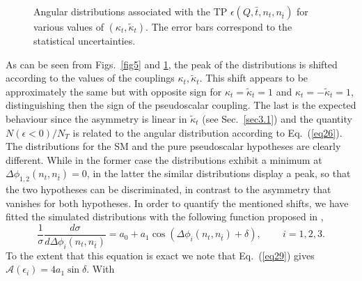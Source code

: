 \documentclass[aps,preprint,tightenlines,floatfix,superscriptaddress,nofootinbib,showpacs]{revtex4-1}
\def\beq{\begin{equation}}
\def\eeq{\end{equation}}
\def\tbar{\bar{t}}
\def\kp{\kappa_t}
\def\kpt{\tilde{\kappa}_t}
\def\TPb{\epsilon(Q,\tbar,n_t,n_{\tbar})}
\begin{document}
\begin{center}
\begin{figure}[H]
\hspace*{-0.006\textwidth}
\caption{Angular distributions associated with the TP $\TPb$ for
  various values of $(\kp,\kpt)$. The error bars correspond to the
  statistical uncertainties.}
\label{fig6}
\end{figure}
\end{center}
\par As can be seen from Figs.~\ref{fig5} and \ref{fig6}, the peak of
the distributions is shifted according to the values of the couplings
$\kp, \kpt$. This shift appears to be approximately the same but with
opposite sign for $\kp=\kpt=1$ and $\kp=-\kpt=1$, distinguishing then
the sign of the pseudoscalar coupling. The last is the expected
behaviour since the asymmetry is linear in $\kpt$ (see
Sec.~\ref{sec3.1}) and the quantity $N(\epsilon < 0)/N_T$ is related
to the angular distribution according to Eq.~(\ref{eq26}). The
distributions for the SM and the pure pseudoscalar hypotheses are
clearly different. While in the former case the distributions exhibit
a minimum at $\Delta\phi_{1,2}(n_t,n_{\tbar})=0$, in the latter the
similar distributions display a peak, so that the two hypotheses can
be discriminated, in contrast to the asymmetry that vanishes for both
hypotheses. In order to quantify the mentioned shifts, we have fitted
the simulated distributions with the following function proposed in
\cite{Ellis},
%
\beq
\label{eq27}
\frac{1}{\sigma}\frac{d\sigma}{d\Delta\phi_i(n_t,n_{\tbar})}=a_0 + a_1\cos(\Delta\phi_i(n_t,n_{\tbar})+\delta),\qquad\, i=1,2,3.
\eeq
%
To the extent that this equation is exact we note that
Eq.~(\ref{eq29}) gives $\mathcal{A}(\epsilon_i)=4a_1 \sin\delta$. With
\end{document}
